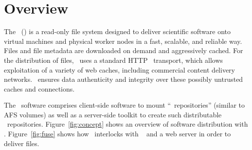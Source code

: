 \chapter{Overview}

The \cernvmfs\ (\cvmfs) is a read-only file system designed to deliver scientific software onto virtual machines and physical worker nodes in a fast, scalable, and reliable way.
Files and file metadata are downloaded on demand and aggressively cached.
For the distribution of files, \cvmfs\ uses a standard HTTP~\cite{rfc1945,rfc2616} transport, which allows exploitation of a variety of web caches, including commercial content delivery networks.
\cvmfs\ ensures data authenticity and integrity over these possibly untrusted caches and connections. %

The \cvmfs\ software comprises client-side software to mount ``\cvmfs\ repositories'' (similar to AFS volumes) as well as a server-side toolkit to create such distributable \cvmfs\ repositories.
Figure~\ref{fig:concept} shows an overview of software distribution with \cvmfs.
Figure~\ref{fig:fuse} shows how \cvmfs\ interlocks with \fuse~\cite{fuse} and a web server in order to deliver files.

